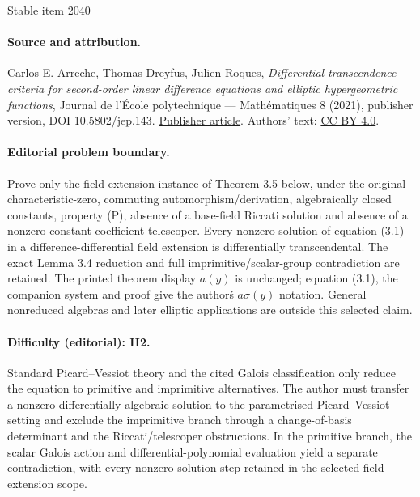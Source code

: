 \documentclass[11pt]{article}
\numberwithin{equation}{section}\providecommand{\loccit}{\textit{loc.\ cit.}}
\begin{document}
\begin{center}{\Large Stable item 2040}\end{center}
\paragraph{Source and attribution.}
Carlos E. Arreche, Thomas Dreyfus, Julien Roques, \emph{Differential transcendence criteria for second-order linear difference equations and elliptic hypergeometric functions}, Journal de l’École polytechnique — Mathématiques 8 (2021), publisher version, DOI 10.5802/jep.143. \href{https://jep.centre-mersenne.org/articles/10.5802/jep.143/}{Publisher article}. Authors' text: \href{https://creativecommons.org/licenses/by/4.0/}{CC BY 4.0}.
\paragraph{Editorial problem boundary.}
Prove only the field-extension instance of Theorem 3.5 below, under the original characteristic-zero, commuting automorphism/derivation, algebraically closed constants, property (P), absence of a base-field Riccati solution and absence of a nonzero constant-coefficient telescoper. Every nonzero solution of equation (3.1) in a difference-differential field extension is differentially transcendental. The exact Lemma 3.4 reduction and full imprimitive/scalar-group contradiction are retained. The printed theorem display \(a(y)\) is unchanged; equation (3.1), the companion system and proof give the author\'s \(a\sigma(y)\) notation. General nonreduced algebras and later elliptic applications are outside this selected claim.
\paragraph{Difficulty (editorial): H2.}
Standard Picard--Vessiot theory and the cited Galois classification only reduce the equation to primitive and imprimitive alternatives. The author must transfer a nonzero differentially algebraic solution to the parametrised Picard--Vessiot setting and exclude the imprimitive branch through a change-of-basis determinant and the Riccati/telescoper obstructions. In the primitive branch, the scalar Galois action and differential-polynomial evaluation yield a separate contradiction, with every nonzero-solution step retained in the selected field-extension scope.
\end{document}
